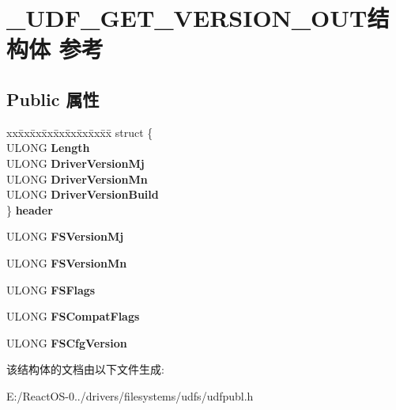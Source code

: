 \hypertarget{struct___u_d_f___g_e_t___v_e_r_s_i_o_n___o_u_t}{}\section{\+\_\+\+U\+D\+F\+\_\+\+G\+E\+T\+\_\+\+V\+E\+R\+S\+I\+O\+N\+\_\+\+O\+U\+T结构体 参考}
\label{struct___u_d_f___g_e_t___v_e_r_s_i_o_n___o_u_t}
\subsection*{Public 属性}
\begin{DoxyCompactItemize}
\item 
\mbox{\label{struct___u_d_f___g_e_t___v_e_r_s_i_o_n___o_u_t_acf1562a43bd8f4a019d3037ae6dbadd0}} 
\begin{tabbing}
xx\=xx\=xx\=xx\=xx\=xx\=xx\=xx\=xx\=\kill
struct \{\\
\>ULONG {\bfseries Length}\\
\>ULONG {\bfseries DriverVersionMj}\\
\>ULONG {\bfseries DriverVersionMn}\\
\>ULONG {\bfseries DriverVersionBuild}\\
\} {\bfseries header}\\

\end{tabbing}\item 
\mbox{\label{struct___u_d_f___g_e_t___v_e_r_s_i_o_n___o_u_t_ab6bc44c2e947434684bcdf7874336167}} 
U\+L\+O\+NG {\bfseries F\+S\+Version\+Mj}
\item 
\mbox{\label{struct___u_d_f___g_e_t___v_e_r_s_i_o_n___o_u_t_a36df80f520586736eaabeb73d92353b3}} 
U\+L\+O\+NG {\bfseries F\+S\+Version\+Mn}
\item 
\mbox{\label{struct___u_d_f___g_e_t___v_e_r_s_i_o_n___o_u_t_a0147e5e6c9bf4aa962a730254a36112b}} 
U\+L\+O\+NG {\bfseries F\+S\+Flags}
\item 
\mbox{\label{struct___u_d_f___g_e_t___v_e_r_s_i_o_n___o_u_t_a675c1f1bc126e17f3912d8a98afb11a6}} 
U\+L\+O\+NG {\bfseries F\+S\+Compat\+Flags}
\item 
\mbox{\label{struct___u_d_f___g_e_t___v_e_r_s_i_o_n___o_u_t_a90964d6644a4becc70a8f7f7edddc775}} 
U\+L\+O\+NG {\bfseries F\+S\+Cfg\+Version}
\end{DoxyCompactItemize}


该结构体的文档由以下文件生成\+:\begin{DoxyCompactItemize}
\item 
E\+:/\+React\+O\+S-\/0../drivers/filesystems/udfs/udfpubl.\+h\end{DoxyCompactItemize}
